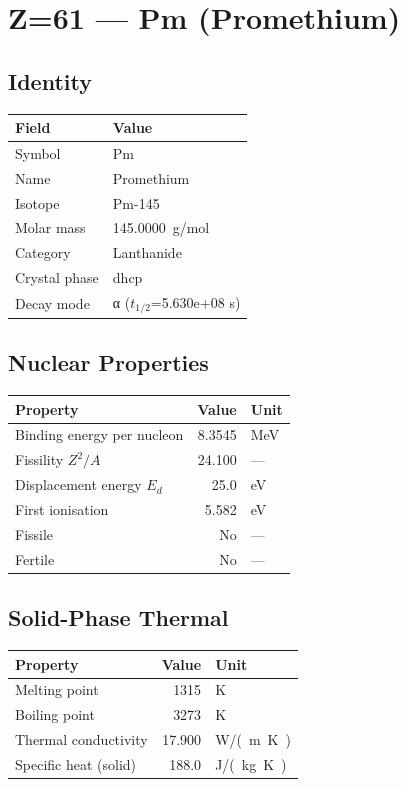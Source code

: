 \documentclass[11pt,a4paper]{article}
\begin{document}
\newpage

\section{Z=61 --- Pm (Promethium)}
\label{sec:Z61}

\subsection{Identity}
\begin{tabular}{ll}
  \toprule
  Field & Value \\
  \midrule
  Symbol & Pm \\
  Name & Promethium \\
  Isotope & Pm-145 \\
  Molar mass & \SI{145.0000}{g/mol} \\
  Category & Lanthanide \\
  Crystal phase & dhcp \\
  Decay mode & α ($t_{1/2}$=5.630e+08 s) \\
  \bottomrule
\end{tabular}

\subsection{Nuclear Properties}
\begin{tabular}{lrl}
  \toprule
  Property & Value & Unit \\
  \midrule
  Binding energy per nucleon & 8.3545 & \si{MeV} \\
  Fissility $Z^2/A$ & 24.100 & --- \\
  Displacement energy $E_d$ & 25.0 & \si{eV} \\
  First ionisation & 5.582 & \si{eV} \\
  Fissile & No & --- \\
  Fertile & No & --- \\
  \bottomrule
\end{tabular}

\subsection{Solid-Phase Thermal}
\begin{tabular}{lrl}
  \toprule
  Property & Value & Unit \\
  \midrule
  Melting point & 1315 & \si{K} \\
  Boiling point & 3273 & \si{K} \\
  Thermal conductivity & 17.900 & \si{W/(m.K)} \\
  Specific heat (solid) & 188.0 & \si{J/(kg.K)} \\
  \bottomrule
\end{tabular}
\end{document}
